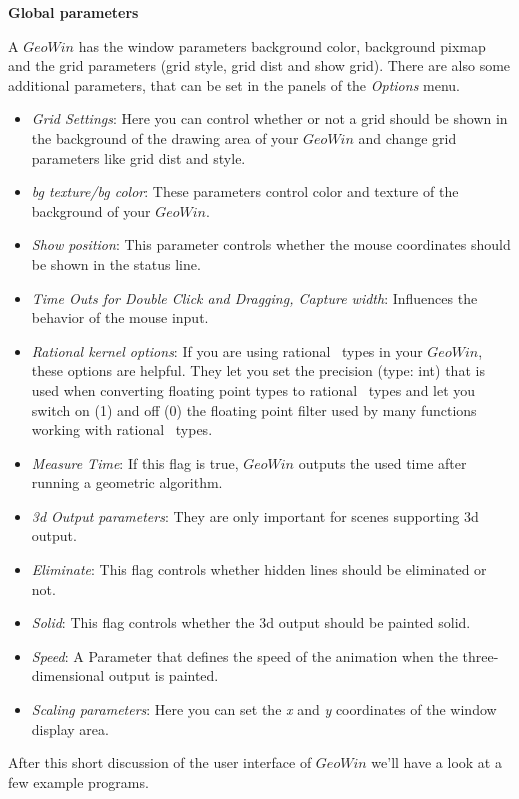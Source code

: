 {\bf Global parameters}

A $GeoWin$ has the window parameters background color, background pixmap and the grid parameters
(grid style, grid dist and show grid).
There are also some additional parameters, that can be set in the panels of the {\em Options} menu.

\begin{itemize}

\item {\em Grid Settings}: Here you can control whether or not a grid should be shown in the
              background of the drawing area of your $GeoWin$ and change grid parameters like grid dist
	      and style.

\item {\em bg texture/bg color}: These parameters control color and texture of the background of 
              your $GeoWin$.

\item {\em Show position}: This parameter controls whether the mouse coordinates should be shown in the status line.
                 
\item {\em Time Outs for Double Click and Dragging, Capture width}: Influences the behavior of the mouse input. 

\item {\em Rational kernel options}: If you are using rational \leda\ types in your $GeoWin$, these options
               are helpful. They let you set the precision (type: int) that is used when converting floating
               point types to rational \leda\ types and let you switch on (1) and off (0) the floating point filter
               used by many functions working with rational \leda\ types. 

\item {\em Measure Time}:  If this flag is true, $GeoWin$ outputs the used time after running a geometric algorithm. 
       
\item {\em 3d Output parameters}: They are only important for scenes supporting 3d output. 

\item {\em Eliminate}: This flag controls whether hidden lines should be eliminated or not. 

\item {\em Solid}: This flag controls whether the 3d output should be painted solid.

\item {\em Speed}: A Parameter that defines the speed of the animation when the three-dimensional output is painted.

\item {\em Scaling parameters}:
Here you can set the {\em x} and {\em y} coordinates of the window display area.

\end{itemize}
After this short discussion of the user interface of $GeoWin$ we'll have a look at a few example programs.


